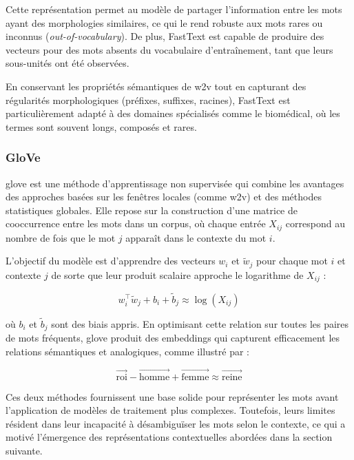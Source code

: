 \documentclass[12pt]{report}
\begin{document}
Cette représentation permet au modèle de partager l'information entre les mots ayant des morphologies similaires, ce qui le rend robuste aux mots rares ou inconnus (\textit{out-of-vocabulary}). De plus, FastText est capable de produire des vecteurs pour des mots absents du vocabulaire d’entraînement, tant que leurs sous-unités ont été observées.

En conservant les propriétés sémantiques de \gls{w2v} tout en capturant des régularités morphologiques (préfixes, suffixes, racines), FastText est particulièrement adapté à des domaines spécialisés comme le biomédical, où les termes sont souvent longs, composés et rares.

\subsubsection{GloVe}

\gls{glove} \cite{pennington2014glove} est une méthode d'apprentissage non supervisée qui combine les avantages des approches basées sur les fenêtres locales (comme \gls{w2v}) et des méthodes statistiques globales. Elle repose sur la construction d'une matrice de cooccurrence entre les mots dans un corpus, où chaque entrée \( X_{ij} \) correspond au nombre de fois que le mot \( j \) apparaît dans le contexte du mot \( i \).

L’objectif du modèle est d’apprendre des vecteurs \( w_i \) et \( \tilde{w}_j \) pour chaque mot \( i \) et contexte \( j \) de sorte que leur produit scalaire approche le logarithme de \( X_{ij} \) :

\[
w_i^\top \tilde{w}_j + b_i + \tilde{b}_j \approx \log(X_{ij})
\]

où \( b_i \) et \( \tilde{b}_j \) sont des biais appris. En optimisant cette relation sur toutes les paires de mots fréquents, \gls{glove} produit des embeddings qui capturent efficacement les relations sémantiques et analogiques, comme illustré par :

\[
\vec{\text{roi}} - \vec{\text{homme}} + \vec{\text{femme}} \approx \vec{\text{reine}}
\]

Ces deux méthodes fournissent une base solide pour représenter les mots avant l'application de modèles de traitement plus complexes. Toutefois, leurs limites résident dans leur incapacité à désambiguïser les mots selon le contexte, ce qui a motivé l’émergence des représentations contextuelles abordées dans la section suivante.
\end{document}
